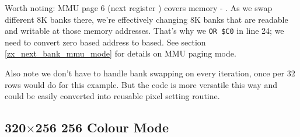 Worth noting: MMU page 6 (next register ) covers memory  - . As we swap different 8K banks there, we're effectively changing 8K banks that are readable and writable at those memory addresses. That's why we {\tt OR \$C0} in line 24; we need to convert zero based address to  based. See section \ref{zx_next_bank_mmu_mode} for details on MMU paging mode.

Also note we don't have to handle bank swapping on every iteration, once per 32 rows would do for this example. But the code is more versatile this way and could be easily converted into reusable pixel setting routine.


\pagebreak
\subsection{320$\times$256 256 Colour Mode}

